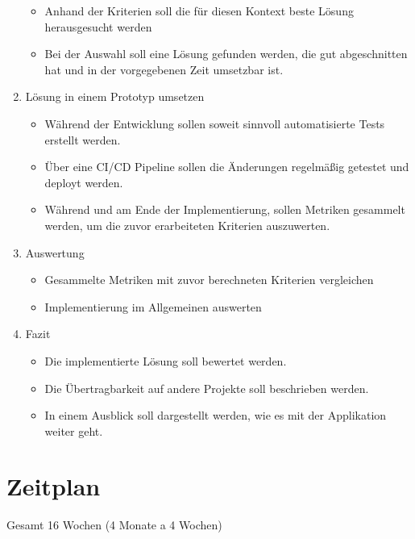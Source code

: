 \begin{enumerate}
  \begin{itemize}
  \item
    Anhand der Kriterien soll die für diesen Kontext beste Lösung herausgesucht werden
    \item Bei der Auswahl soll eine Lösung gefunden werden, die gut abgeschnitten hat und in der vorgegebenen Zeit umsetzbar ist.
  \end{itemize}
\item
  Lösung in einem Prototyp umsetzen

  \begin{itemize}
  \item Während der Entwicklung sollen soweit sinnvoll automatisierte Tests erstellt werden.
  \item Über eine CI/CD Pipeline sollen die Änderungen regelmäßig getestet und deployt werden.
  \item
    Während und am Ende der Implementierung, sollen Metriken gesammelt werden, um die zuvor erarbeiteten Kriterien auszuwerten.
  \end{itemize}
\item
  Auswertung

  \begin{itemize}
  \item
    Gesammelte Metriken mit zuvor berechneten Kriterien vergleichen
  \item
    Implementierung im Allgemeinen auswerten
  \end{itemize}
  \item Fazit
\begin{itemize}
    \item Die implementierte Lösung soll bewertet werden.
    \item Die Übertragbarkeit auf andere Projekte soll beschrieben werden.
    \item In einem Ausblick soll dargestellt werden, wie es mit der Applikation weiter geht.
\end{itemize}
\end{enumerate}

\section{Zeitplan}\label{sec:zeitplan}

Gesamt 16 Wochen (4 Monate a 4 Wochen)

